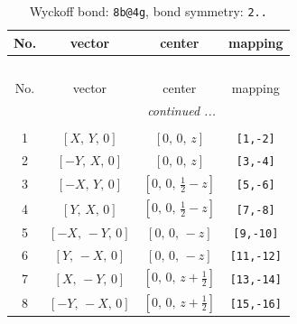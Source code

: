 \documentclass[fleqn,8pt]{jsarticle}
\begin{document}
\begin{longtable}{cccc}
\caption{Wyckoff bond: {\tt 8b@4g}, bond symmetry: {\tt 2..}}
 \\
 \hline \hline
No. & vector & center & mapping \\ \hline \endfirsthead

\multicolumn{3}{l}{\tablename\ \thetable{}} \\
 \hline \hline
No. & vector & center & mapping \\ \hline \endhead

 \hline \hline
\multicolumn{3}{r}{\footnotesize\it continued ...} \\ \endfoot

 \hline \hline
\multicolumn{3}{r}{} \\ \endlastfoot

1 & $\left[ X,\, Y,\, 0 \right]$ & $\left[ 0,\, 0,\, z \right]$ & {\tt [1,-2]} \\ \hline
2 & $\left[ - Y,\, X,\, 0 \right]$ & $\left[ 0,\, 0,\, z \right]$ & {\tt [3,-4]} \\ \hline
3 & $\left[ - X,\, Y,\, 0 \right]$ & $\left[ 0,\, 0,\, \frac{1}{2} - z \right]$ & {\tt [5,-6]} \\ \hline
4 & $\left[ Y,\, X,\, 0 \right]$ & $\left[ 0,\, 0,\, \frac{1}{2} - z \right]$ & {\tt [7,-8]} \\ \hline
5 & $\left[ - X,\, - Y,\, 0 \right]$ & $\left[ 0,\, 0,\, - z \right]$ & {\tt [9,-10]} \\ \hline
6 & $\left[ Y,\, - X,\, 0 \right]$ & $\left[ 0,\, 0,\, - z \right]$ & {\tt [11,-12]} \\ \hline
7 & $\left[ X,\, - Y,\, 0 \right]$ & $\left[ 0,\, 0,\, z + \frac{1}{2} \right]$ & {\tt [13,-14]} \\ \hline
8 & $\left[ - Y,\, - X,\, 0 \right]$ & $\left[ 0,\, 0,\, z + \frac{1}{2} \right]$ & {\tt [15,-16]} \\
\end{longtable}
\renewcommand{\arraystretch}{1.2}
\end{document}
